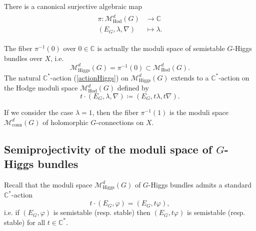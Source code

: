 \documentclass[11pt, reqno]{amsart}
\numberwithin{equation}{section}
\theoremstyle{definition}
\begin{document}
	There is a canonical surjective algebraic map 
	\begin{align}\label{proj}
 \begin{split}
	\pi: \mathcal{M}^d_\mathrm{Hod}(G) &\longrightarrow \mathbb{C}\\
 (E_G,\lambda,\nabla) &\longmapsto \lambda.
 \end{split}
	\end{align}
	
	The fiber $\pi^{-1}(0)$ over $0 \in \mathbb{C}$ is actually the moduli space of semistable $G$-Higgs bundles over $X$, i.e.
	\[
	\mathcal{M}^d_{\mathrm{Higgs}}(G) = \pi^{-1}(0) \subset \mathcal{M}^d_\mathrm{Hod}(G). 
	\]
	The natural $\mathbb{C}^*$-action (\ref{actionHiggs}) on $\mathcal{M}^d_{\mathrm{Higgs}}(G)$ extends to a $\mathbb{C}^*$-action on the Hodge moduli space $\mathcal{M}^d_\mathrm{Hod}(G)$ defined by 
	\begin{equation}\label{action}
	    t\cdot (E_G,\lambda,\nabla) \coloneqq (E_G,t\lambda,t\nabla).
	\end{equation}
	
	If we consider the case $\lambda = 1$, then the fiber $\pi^{-1}(1)$ is the moduli space $\mathcal{M}^d_{\mathrm{conn}}(G)$ of holomorphic $G$-connections on $X$.


\subsection{Semiprojectivity of the moduli space of $G$-Higgs bundles} Recall that the moduli space $\mathcal{M}^d_{\mathrm{Higgs}}(G)$ of $G$-Higgs bundles admits a standard $\mathbb{C}^*$-action
\[
t \cdot (E_G,\varphi) = (E_G,t\varphi),
\]
i.e. if $(E_G,\varphi)$ is semistable (resp. stable) then $(E_G,t\varphi)$ is semistable (resp. stable) for all $t\in \mathbb{C}^*$.
\end{document}
